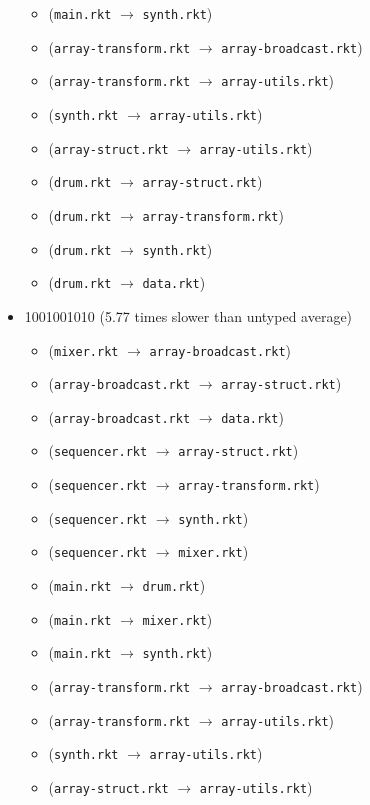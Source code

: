 \documentclass{article}
\newcommand{\mono}[1]{\texttt{#1}}
\begin{document}
\begin{itemize}
\begin{itemize}
  \item (\mono{main.rkt} $\rightarrow$ \mono{synth.rkt})
  \item (\mono{array-transform.rkt} $\rightarrow$ \mono{array-broadcast.rkt})
  \item (\mono{array-transform.rkt} $\rightarrow$ \mono{array-utils.rkt})
  \item (\mono{synth.rkt} $\rightarrow$ \mono{array-utils.rkt})
  \item (\mono{array-struct.rkt} $\rightarrow$ \mono{array-utils.rkt})
  \item (\mono{drum.rkt} $\rightarrow$ \mono{array-struct.rkt})
  \item (\mono{drum.rkt} $\rightarrow$ \mono{array-transform.rkt})
  \item (\mono{drum.rkt} $\rightarrow$ \mono{synth.rkt})
  \item (\mono{drum.rkt} $\rightarrow$ \mono{data.rkt})
  \end{itemize}
\item 1001001010 (5.77 times slower than untyped average)
  \begin{itemize}
  \item (\mono{mixer.rkt} $\rightarrow$ \mono{array-broadcast.rkt})
  \item (\mono{array-broadcast.rkt} $\rightarrow$ \mono{array-struct.rkt})
  \item (\mono{array-broadcast.rkt} $\rightarrow$ \mono{data.rkt})
  \item (\mono{sequencer.rkt} $\rightarrow$ \mono{array-struct.rkt})
  \item (\mono{sequencer.rkt} $\rightarrow$ \mono{array-transform.rkt})
  \item (\mono{sequencer.rkt} $\rightarrow$ \mono{synth.rkt})
  \item (\mono{sequencer.rkt} $\rightarrow$ \mono{mixer.rkt})
  \item (\mono{main.rkt} $\rightarrow$ \mono{drum.rkt})
  \item (\mono{main.rkt} $\rightarrow$ \mono{mixer.rkt})
  \item (\mono{main.rkt} $\rightarrow$ \mono{synth.rkt})
  \item (\mono{array-transform.rkt} $\rightarrow$ \mono{array-broadcast.rkt})
  \item (\mono{array-transform.rkt} $\rightarrow$ \mono{array-utils.rkt})
  \item (\mono{synth.rkt} $\rightarrow$ \mono{array-utils.rkt})
  \item (\mono{array-struct.rkt} $\rightarrow$ \mono{array-utils.rkt})

\end{itemize}
\end{itemize}
\end{document}

